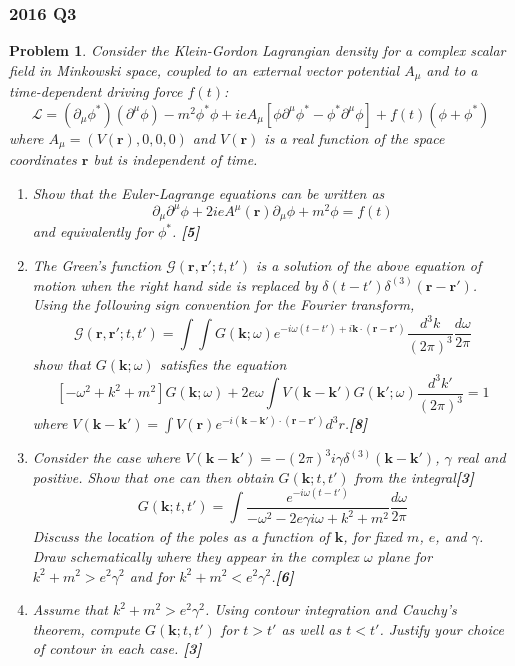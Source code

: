\documentclass[a4paper]{article}
\theoremstyle{new}
\newtheorem{qns}{Problem}[section]
\begin{document}
\subsubsection*{2016 Q3}
\begin{qns}
Consider the Klein-Gordon Lagrangian density for a complex scalar field in Minkowski space, coupled to an external vector potential $A_\mu$ and to a time-dependent driving force $f(t)$:
$$\mathcal{L}=(\partial_\mu\phi^*)(\partial^\mu\phi)-m^2\phi^*\phi+ieA_\mu[\phi\partial^\mu\phi^*-\phi^*\partial^\mu\phi]+f(t)(\phi+\phi^*)$$
where $A_\mu=(V(\mathbf{r}),0,0,0)$ and $V(\mathbf{r})$ is a real function of the space coordinates $\mathbf{r}$ but is independent of time.
\begin{enumerate}[label=(\alph*)]
\item Show that the Euler-Lagrange equations can be written as
$$\partial_\mu\partial^\mu\phi+2ieA^\mu(\mathbf{r})\partial_\mu\phi+m^2\phi=f(t)$$
and equivalently for $\phi^*$. \hfill\textbf{[5]}
\item The Green’s function $\mathcal{G}(\mathbf{r},\mathbf{r'};t,t')$ is a solution of the above equation of motion when the right hand side is replaced by $\delta(t-t')\delta^{(3)}(\mathbf{r}-\mathbf{r'})$. Using the following sign convention for the Fourier transform,
$$\mathcal{G}(\mathbf{r},\mathbf{r'};t,t')=\int\int G(\mathbf{k};\omega)e^{-i\omega(t-t')+i\mathbf{k}\cdot(\mathbf{r}-\mathbf{r'})}\frac{d^3k}{(2\pi)^3}\frac{d\omega}{2\pi}$$
show that $G(\mathbf{k};\omega)$ satisfies the equation
$$[-\omega^2+k^2+m^2]G(\mathbf{k};\omega)+2e\omega\int V(\mathbf{k}-\mathbf{k'})G(\mathbf{k'};\omega)\frac{d^3k'}{(2\pi)^3}=1$$
where $V(\mathbf{k}-\mathbf{k'})=\int V(\mathbf{r})e^{-i(\mathbf{k}-\mathbf{k'})\cdot(\mathbf{r}-\mathbf{r'})}d^3r$.\hfill\textbf{[8]}
\item Consider the case where $V(\mathbf{k}-\mathbf{k'})=-(2\pi)^3i\gamma\delta^{(3)}(\mathbf{k}-\mathbf{k'})$, $\gamma$ real and positive. Show that one can then obtain $G(\mathbf{k};t,t')$ from the integral\hfill\textbf{[3]}
$$G(\mathbf{k};t,t')=\int\frac{e^{-i\omega(t-t')}}{-\omega^2-2e\gamma i\omega+k^2+m^2}\frac{d\omega}{2\pi}$$
Discuss the location of the poles as a function of $\mathbf{k}$, for fixed $m$, $e$, and $\gamma$. Draw schematically where they appear in the complex $\omega$ plane for $k^2+m^2>e^2\gamma^2$ and for $k^2+m^2<e^2\gamma^2$.\hfill\textbf{[6]}
\item Assume that $k^2+m^2>e^2\gamma^2$.  Using contour integration and Cauchy’s theorem, compute $G(\mathbf{k};t,t')$ for $t>t'$ as well as $t<t'$. Justify your choice of contour in each case. \hfill\textbf{[3]}
\end{enumerate}
\end{qns}
\end{document}
